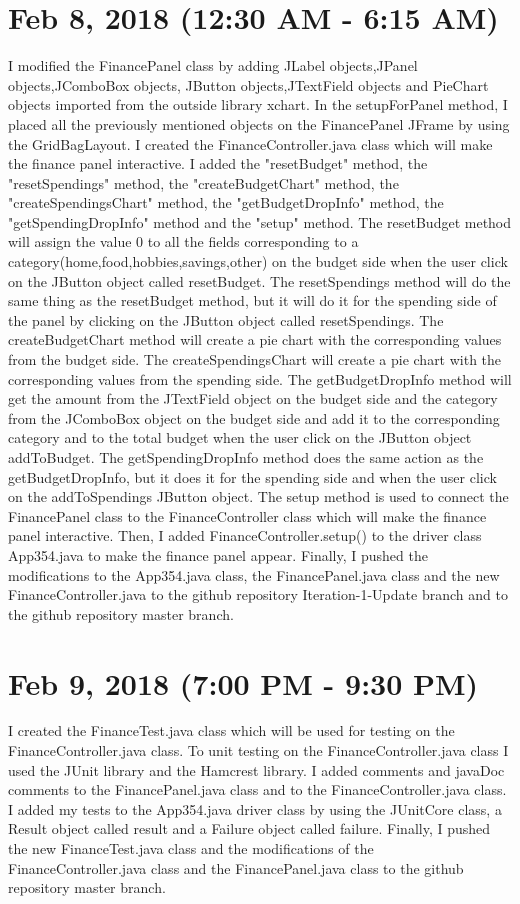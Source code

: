 \documentclass{article}
\begin{document}
\section{Feb 8, 2018 (12:30 AM - 6:15 AM)}
I modified the FinancePanel class by adding JLabel objects,JPanel objects,JComboBox objects, JButton objects,JTextField objects and PieChart objects imported from the outside library xchart. In the setupForPanel method, I placed all the previously mentioned objects on the FinancePanel JFrame by using the GridBagLayout. I created the FinanceController.java class which will make the finance panel interactive. I added the "resetBudget" method, the "resetSpendings" method, the "createBudgetChart" method, the "createSpendingsChart" method, the "getBudgetDropInfo" method, the "getSpendingDropInfo" method and the "setup" method. The resetBudget method will assign the value 0 to all the fields corresponding to a category(home,food,hobbies,savings,other) on the budget side when the user click on the JButton object called resetBudget. The resetSpendings method will do the same thing as the resetBudget method, but it will do it for the spending side of the panel by clicking on the JButton object called resetSpendings. The createBudgetChart method will create a pie chart with the corresponding values from the budget side. The createSpendingsChart will create a pie chart with the corresponding values from the spending side. The getBudgetDropInfo method will get the amount from the JTextField object on the budget side and the category from the JComboBox object on the budget side and add it to the corresponding category and to the total budget when the user click on the JButton object addToBudget. The getSpendingDropInfo method does the same action as the getBudgetDropInfo, but it does it for the spending side and when the user click on the addToSpendings JButton object. The setup method is used to connect the FinancePanel class to the FinanceController class which will make the finance panel interactive. Then, I added FinanceController.setup() to the driver class App354.java to make the finance panel appear. Finally, I pushed the modifications to the App354.java class, the FinancePanel.java class and the new FinanceController.java to the github repository Iteration-1-Update branch and to the github repository master branch.
\section{Feb 9, 2018 (7:00 PM - 9:30 PM)}
I created the FinanceTest.java class which will be used for testing on the FinanceController.java class. To unit testing on the FinanceController.java class I used the JUnit library and the Hamcrest library. I added comments and javaDoc comments to the FinancePanel.java class and to the FinanceController.java class. I added my tests to the App354.java driver class by using the JUnitCore class, a Result object called result and a Failure object called failure. Finally, I pushed the new FinanceTest.java class and the modifications of the FinanceController.java class and the FinancePanel.java class to the github repository master branch.
\end{document}
